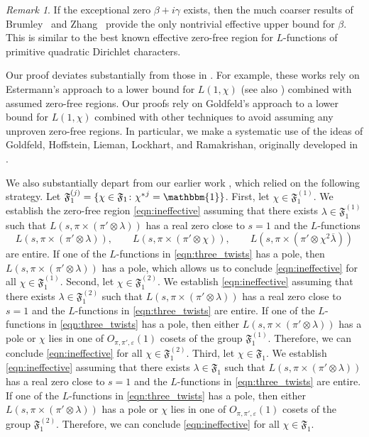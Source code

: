 \documentclass[12pt]{amsart}
\theoremstyle{definition}
\theoremstyle{remark}
\newtheorem{remark}[theorem]{Remark}
\numberwithin{equation}{section}
\theoremstyle{plain}
\renewcommand{\bar}{\overline}
\renewcommand{\epsilon}{\varepsilon}
\begin{document}
\begin{remark}
If the exceptional zero $\beta+i\gamma$ exists, then the much coarser results of Brumley~\cite{Brumley,Lapid} and Zhang~\cite{Zhang} provide the only nontrivial effective upper bound for $\beta$.  This is similar to the best known effective zero-free region for $L$-functions of primitive quadratic Dirichlet characters.
\end{remark}

Our proof deviates substantially from those in \cite{IM,Tatuzawa}.  For example, these works rely on Estermann's approach to a lower bound for $L(1,\chi)$ \cite{Estermann} (see also \cite[\S20]{Davenport}) combined with assumed zero-free regions.  Our proofs rely on Goldfeld's approach to a lower bound for $L(1,\chi)$ \cite{Goldfeld} combined with other techniques to avoid assuming any unproven zero-free regions. In particular, we make a systematic use of the ideas of Goldfeld, Hoffstein, Lieman, Lockhart, and Ramakrishan, originally developed in \cite{HoffsteinLockhart,HoffsteinRamakrishnan}.

We also substantially depart from our earlier work \cite{HarcosThorner}, which relied on the following strategy.  Let $\mathfrak{F}_1^{(j)}=\{\chi\in\mathfrak{F}_1\colon {\chi^*}^j=\mathbbm{1}\}$.  First, let $\chi\in\mathfrak{F}_1^{(1)}$.  We establish the zero-free region \eqref{eqn:ineffective} assuming that there exists $\lambda\in\mathfrak{F}_1^{(1)}$ such that $L(s,\pi\times(\pi'\otimes\lambda))$ has a real zero close to $s=1$ and the $L$-functions
\begin{equation}
\label{eqn:three_twists}
L(s,\pi\times(\pi'\otimes\lambda)),\qquad L(s,\pi\times(\pi'\otimes\chi)),\qquad L(s,\pi\times(\pi'\otimes\chi^2\bar{\lambda}))
\end{equation}
are entire.  If one of the $L$-functions in \eqref{eqn:three_twists} has a pole, then $L(s,\pi\times(\pi'\otimes\lambda))$ has a pole, which allows us to conclude \eqref{eqn:ineffective} for all $\chi\in\mathfrak{F}_1^{(1)}$.  Second, let $\chi\in\mathfrak{F}_1^{(2)}$.  We establish \eqref{eqn:ineffective} assuming that there exists $\lambda\in\mathfrak{F}_1^{(2)}$ such that $L(s,\pi\times(\pi'\otimes\lambda))$ has a real zero close to $s=1$ and the $L$-functions in \eqref{eqn:three_twists} are entire.  If one of the $L$-functions in \eqref{eqn:three_twists} has a pole, then either $L(s,\pi\times(\pi'\otimes\lambda))$ has a pole or $\chi$ lies in one of $O_{\pi,\pi',\epsilon}(1)$ cosets of the group $\mathfrak{F}_1^{(1)}$.  Therefore, we can conclude \eqref{eqn:ineffective} for all $\chi\in\mathfrak{F}_1^{(2)}$.  Third, let $\chi\in\mathfrak{F}_1$.  We establish \eqref{eqn:ineffective} assuming that there exists $\lambda\in\mathfrak{F}_1$ such that $L(s,\pi\times(\pi'\otimes\lambda))$ has a real zero close to $s=1$ and the $L$-functions in \eqref{eqn:three_twists} are entire.  If one of the $L$-functions in \eqref{eqn:three_twists} has a pole, then either $L(s,\pi\times(\pi'\otimes\lambda))$ has a pole or $\chi$ lies in one of $O_{\pi,\pi',\epsilon}(1)$ cosets of the group $\mathfrak{F}_1^{(2)}$.  Therefore, we can conclude \eqref{eqn:ineffective} for all $\chi\in\mathfrak{F}_1$.
\end{document}
